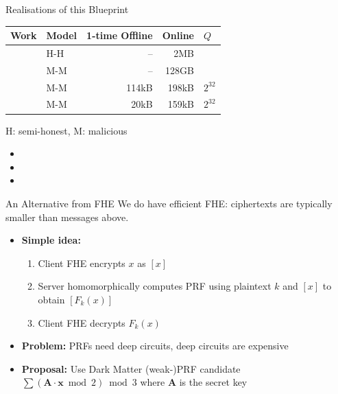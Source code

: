 \documentclass[xcolor=table,10pt,aspectratio=169]{beamer}
\renewcommand{\vec}[1]{\ensuremath{\mathbf{#1}}\xspace}
\providecommand{\mat}[1]{\ensuremath{\vec{#1}}\xspace}
\begin{document}
\begin{frame}[label={sec:org0b98277}]{Realisations of this Blueprint}
\begin{center}
\begin{tabular}{llrrl}
\toprule
Work & Model & 1-time Offline & Online & \(Q\)\\
\midrule
\cite{PKC:ADDS21} & H-H & -- & 2MB & \\
\cite{PKC:ADDS21} & M-M & -- & 128GB & \\
\cite{AC:AlbGur24} & M-M & 114kB & 198kB & \(2^{32}\)\\
\cite{EPRINT:ESTX24} & M-M & 20kB & 159kB & \(2^{32}\)\\
\bottomrule
\end{tabular}

\end{center}

\begin{center}
H: semi-honest, M: malicious
\end{center}

\begin{itemize}
\item {\footnotesize {} \par}
\item {\footnotesize {} \par}
\item {\footnotesize {} \par}
\end{itemize}
\end{frame}
\begin{frame}[label={sec:orgbe80f04}]{An Alternative from FHE}
We do have efficient FHE: ciphertexts are typically \alert{smaller} than messages above.
\begin{itemize}
\item \textbf{Simple idea:}
\begin{enumerate}
\item Client FHE encrypts \(x\) as \([x]\)
\item Server homomorphically computes PRF using plaintext \(k\) and \([x]\) to obtain \([F_{k}(x)]\)
\item Client FHE decrypts \(F_{k}(x)\)
\end{enumerate}
\item \textbf{Problem:} PRFs need deep circuits, deep circuits are expensive
\item \textbf{Proposal:} Use Dark Matter (weak-)PRF candidate \cite{TCC:BIPSW18} \(\sum \left(\mat{A}\cdot \vec{x} \bmod 2\right) \bmod 3\) where \(\mat{A}\) is the secret key
\end{itemize}


{\footnotesize {} \par}
\end{frame}
\end{document}
